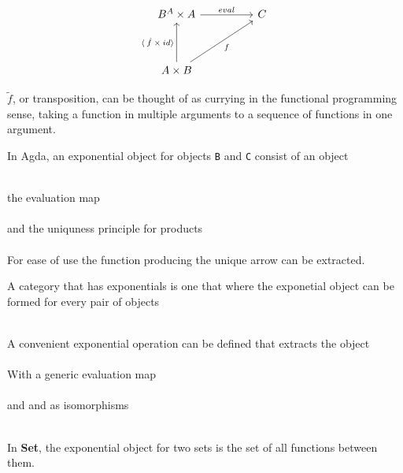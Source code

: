 \[\begin{tikzcd}[sep=huge]
    B^{A} \times A \arrow[r, "eval"]
    & C \\
    A \times B \arrow[ru, "f"'] \arrow[u, "\langle \: \hat{f} \: \times \: id
    \rangle"] &
\end{tikzcd}\]

$\tilde{f}$, or transposition, can be thought of as currying in the functional
programming sense, taking a function in multiple arguments to a sequence of
functions in one argument.

In Agda, an exponential object for objects \verb|B| and \verb|C| consist of an
object

\begin{AgdaMultiCode}
\\
the evaluation map
\\
\\
and the uniquness principle for products
\\
\\
For ease of use the function producing the unique arrow can be extracted.\\
\end{AgdaMultiCode}

A category that has exponentials is one that  where the exponetial object can be
formed for every pair of objects

\begin{AgdaMultiCode}
\\
A convenient exponential operation can be defined that extracts the object
\\
\\
With a generic evaluation map
\\
\\
and  and  as isomorphisms
\\
\\
\end{AgdaMultiCode}

In \textbf{Set}, the exponential object for two sets is the set of all functions
between them.


